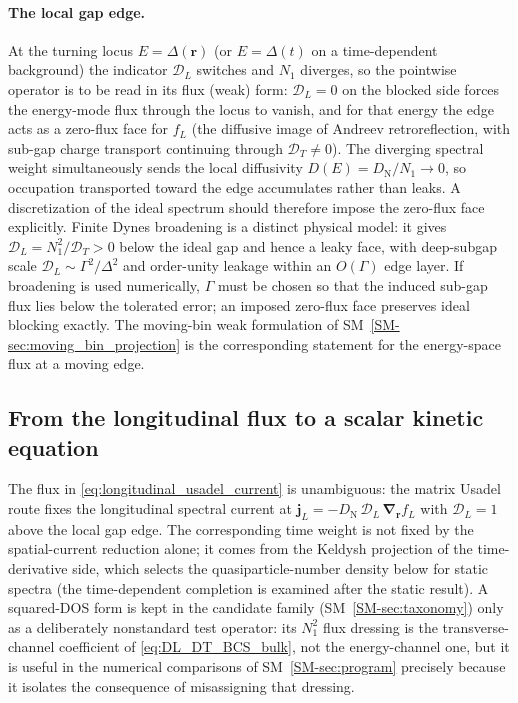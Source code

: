 \documentclass[
  aps,
  prb,
  preprint,
  superscriptaddress,
  longbibliography,
  nofootinbib
]{revtex4-2}
\newcommand{\br}{\mathbf{r}}
\newcommand{\bnabla}{\boldsymbol{\nabla}}
\newcommand{\DOS}{N_1}
\newcommand{\DN}{D_{\mathrm{N}}}
\newcommand{\DE}{D(E)}
\newcommand{\fL}{f_L}
\begin{document}
\paragraph{The local gap edge.} At the turning locus \(E=\Delta(\br)\)
(or \(E=\Delta(t)\) on a time-dependent background) the indicator
\(\mathcal D_L\) switches and \(\DOS\) diverges, so the pointwise
operator is to be read in its flux (weak) form: \(\mathcal D_L=0\) on
the blocked side forces the energy-mode flux through the locus to
vanish, and for that energy the edge acts as a zero-flux face for
\(\fL\) (the diffusive image of Andreev retroreflection, with sub-gap
charge transport continuing through \(\mathcal D_T\neq0\)). The
diverging spectral weight simultaneously sends the local diffusivity
\(\DE=\DN/\DOS\to0\), so occupation transported toward the edge accumulates
rather than leaks. A discretization of the ideal spectrum should therefore
impose the zero-flux face explicitly.
Finite Dynes broadening is a
distinct physical model: it gives \(\mathcal D_L=\DOS^2/\mathcal D_T>0\)
below the ideal gap and hence a leaky face, with deep-subgap scale
\(\mathcal D_L\sim\Gamma^2/\Delta^2\) and order-unity leakage within an
\(O(\Gamma)\) edge layer. If broadening is used numerically, \(\Gamma\) must
be chosen so that the induced sub-gap flux lies below the tolerated error;
an imposed zero-flux face preserves ideal blocking exactly. The moving-bin
weak formulation of SM~\cref{SM-sec:moving_bin_projection} is the
corresponding statement for the energy-space flux at a moving edge.

\subsection{From the longitudinal flux to a scalar kinetic equation}

The flux in \cref{eq:longitudinal_usadel_current} is
unambiguous: the matrix Usadel route fixes the longitudinal spectral current
at \(\mathbf{j}_L=-\DN\,\mathcal{D}_L\,\bnabla_{\br}\fL\) with
\(\mathcal{D}_L=1\) above the local gap edge. The corresponding time
weight is not fixed by the spatial-current reduction alone; it comes from the
Keldysh projection of the time-derivative side, which selects the
quasiparticle-number density below for static spectra (the time-dependent
completion is examined after the static result). A squared-DOS form is
kept in the candidate family (SM~\cref{SM-sec:taxonomy}) only as a
deliberately nonstandard test operator: its \(\DOS^2\)
flux dressing is the transverse-channel coefficient of
\cref{eq:DL_DT_BCS_bulk}, not the energy-channel one, but it is
useful in the numerical comparisons of SM~\cref{SM-sec:program} precisely
because it isolates the consequence of misassigning that dressing.
\end{document}
